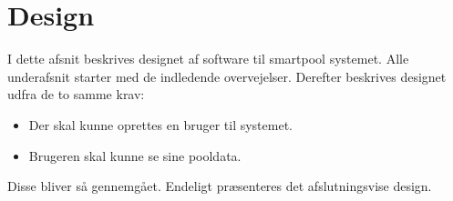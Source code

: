 \chapter{Design}\label{cha:design}

I dette afsnit beskrives designet af software til \gls{smartpool} systemet. Alle underafsnit starter med de indledende overvejelser. Derefter beskrives designet udfra de to samme krav: 

\begin{itemize}
	\item Der skal kunne oprettes en bruger til systemet.
	\item Brugeren skal kunne se sine pooldata.
\end{itemize}

Disse bliver så gennemgået. Endeligt præsenteres det afslutningsvise design.



%